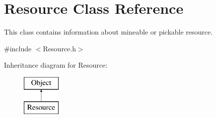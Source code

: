 \hypertarget{classResource}{\section{Resource Class Reference}
\label{classResource}
}


This class contains information about mineable or pickable resource.  




{\ttfamily \#include $<$Resource.\-h$>$}

Inheritance diagram for Resource\-:\begin{figure}[H]
\begin{center}
\leavevmode
\includegraphics[height=2.000000cm]{classResource}
\end{center}
\end{figure}

